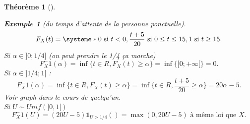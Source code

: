 \documentclass{article}
\theoremstyle{plain}%
\newtheorem{thm}{Théorème}[section]
\theoremstyle{definition}
\newtheorem{exmp}{Exemple}[section]
\theoremstyle{remark}
\begin{document}
\begin{thm}[]
        \begin{exmp}[du temps d'attente de la personne ponctuelle]
            
            \[
                F_X(t) = \systeme*{
                    0 \text{ si } t<0, 
                    \frac{t+5}{20} \text{ si } 0 \leq t \leq 15,
                    1 \text{ si } t \geq 15
                }
            .\]
            Si $ \alpha \in ]0;1/4] $ (on peut prendre le 1/4 ça marche) 
            \[
                F_X^-1 (\alpha ) = \inf \{t \in R, F_X(t) \geq \alpha \} = \inf \{[0; + \infty [\} = 0
            .\]
            Si $ \alpha \in ]1/4 ; 1[ $ :
            \[
                F_X^-1 (\alpha ) = \inf \{t \in R, F_X(t) \geq \alpha \} = \inf \{t \in R, \frac{t+5}{20} \geq \alpha\} = 20 \alpha - 5
            .\]
            Voir graph dans le cours de quelqu'un. \\
            Si $ U \sim Unif(]0,1[) $ 
            \[
                F_X^-1(U) = (20U-5) \mathbb{1}_{U>1/4}() = \max (0,20U-5) \text{ à même loi que } X
            .\]
            
        \end{exmp}
    \end{thm}
\end{document}
